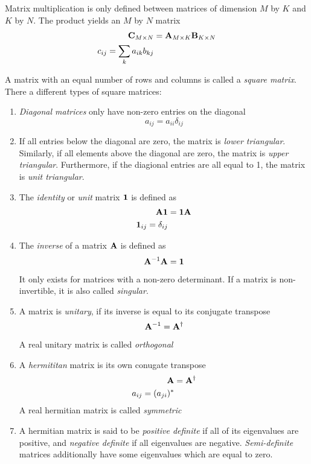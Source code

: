Matrix multiplication is only defined between matrices of dimension $M$ by $K$ and $K$ by $N$. The product yields an $M$ by $N$ matrix
\begin{align}
\mathbf{C}_{M\times N} &= \mathbf{A}_{M\times K} \mathbf{B}_{K\times N} \\
c_{ij} = \sum_k a_{ik} b_{kj}
\end{align}

A matrix with an equal number of rows and columns is called a \emph{square matrix}. There a different types of square matrices:
\begin{enumerate}
\item \emph{Diagonal matrices} only have non-zero entries on the diagonal
\begin{equation}
a_{ij} = a_{ii} \delta_{ij}
\end{equation}

\item If all entries below the diagonal are zero, the matrix is \emph{lower triangular}. Similarly, if all elements above the diagonal are zero, the matrix is \emph{upper triangular}. Furthermore, if the diagional entries are all equal to 1, the matrix is \emph{unit triangular}.

\item The \emph{identity} or \emph{unit} matrix $\mathbf{1}$ is defined as
\begin{align}
\mathbf{A} \mathbf{1} &= \mathbf{1} \mathbf{A} \\
\mathbf{1}_{ij} = \delta_{ij}
\end{align} 

\item The \emph{inverse} of a matrix $\mathbf{A}$ is defined as
\begin{equation}
\mathbf{A}^{-1} \mathbf{A} = \mathbf{1}
\end{equation} 
\noindent It only exists for matrices with a non-zero determinant. If a matrix is non-invertible, it is also called \emph{singular}. 

\item A matrix is \emph{unitary}, if its inverse is equal to its conjugate transpose 
\begin{equation}
\mathbf{A}^{-1} = \mathbf{A}^{\dagger}
\end{equation}
\noindent A real unitary matrix is called \emph{orthogonal}

\item A \emph{hermititan} matrix is its own conugate transpose
\begin{align}
\mathbf{A} &= \mathbf{A}^{\dagger} \\
a_{ij} = (a_{ji})^*
\end{align}
\noindent A real hermitian matrix is called \emph{symmetric}

\item A hermitian matrix is said to be \emph{positive definite} if all of its eigenvalues are positive, and \emph{negative definite} if all eigenvalues are negative. \emph{Semi-definite} matrices additionally have some eigenvalues which are equal to zero.   
\end{enumerate}

